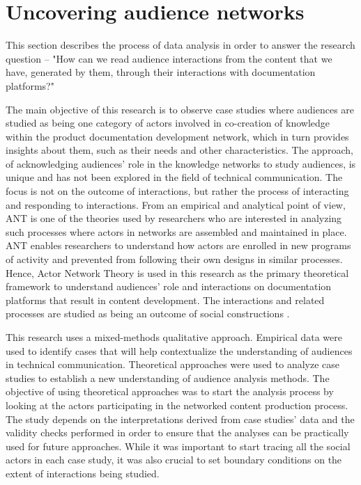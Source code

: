 \section{Uncovering audience networks}
This section describes the process of data analysis in order to answer the research question – "How can we read audience interactions from the content that we have, generated by them, through their interactions with documentation platforms?"

The main objective of this research is to observe case studies where audiences are studied as being one category of actors involved in co-creation of knowledge within the product documentation development network, which in turn provides insights about them, such as their needs and other characteristics. The approach, of acknowledging audiences' role in the knowledge networks to study audiences, is unique and has not been explored in the field of technical communication. The focus is not on the outcome of interactions, but rather the process of interacting and responding to interactions. From an empirical and analytical point of view, ANT is one of the theories used by researchers who are interested in analyzing such processes where actors in networks are assembled and maintained in place. ANT enables researchers to understand how actors are enrolled in new programs of activity and prevented from following their own designs in similar processes. Hence, Actor Network Theory is used in this research as the primary theoretical framework to understand audiences' role and interactions on documentation platforms that result in content development. The interactions and related processes are studied as being an outcome of social constructions \cite{lincoln2011paradigmatic}.

This research uses a mixed-methods qualitative approach. Empirical data were used to identify cases that will help contextualize the understanding of audiences in technical communication. Theoretical approaches were used to analyze case studies to establish a new understanding of audience analysis methods. The objective of using theoretical approaches was to start the analysis process by looking at the actors participating in the networked content production process. The study depends on the interpretations derived from case studies' data and the validity checks performed in order to ensure that the analyses can be practically used for future approaches. While it was important to start tracing all the social actors in each case study, it was also crucial to set boundary conditions on the extent of interactions being studied.

